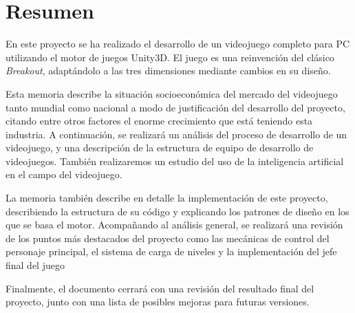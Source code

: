 \chapter{Resumen}
En este proyecto se ha realizado el desarrollo de un videojuego completo para PC utilizando el motor de juegos Unity3D. El juego es una reinvención del clásico \textit{Breakout}, adaptándolo a las tres dimensiones mediante cambios en su diseño.

Esta memoria describe la situación socioeconómica del mercado del videojuego tanto mundial como nacional a modo de justificación del desarrollo del proyecto, citando entre otros factores el enorme crecimiento que está teniendo esta industria. A continuación, se realizará un análisis del proceso de desarrollo de un videojuego, y una descripción de la estructura de equipo de desarrollo de videojuegos. También realizaremos un estudio del uso de la inteligencia artificial en el campo del videojuego. 

La memoria también describe en detalle la implementación de este proyecto, describiendo la estructura de su código y explicando los patrones de diseño en los que se basa el motor. Acompañando al análisis general, se realizará una revisión de los puntos más destacados del proyecto como las mecánicas de control del personaje principal, el sistema de carga de niveles y la implementación del jefe final del juego

Finalmente, el documento cerrará con una revisión del resultado final del proyecto, junto con una lista de posibles mejoras para futuras versiones.
